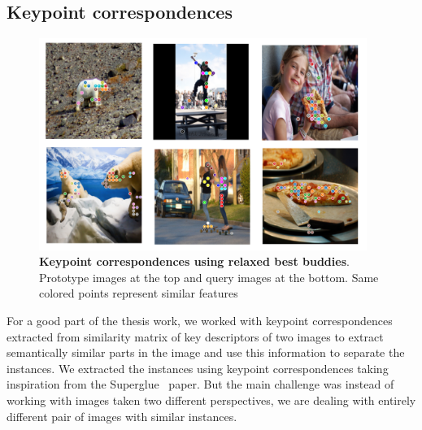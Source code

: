 \subsection{Keypoint correspondences}
\begin{figure}
	\centering
	\includegraphics[width=0.95\textwidth]{Images/main/correspondences.png}
	\caption[\textbf{Keypoint correspondences using relaxed best buddies}]{\textbf{Keypoint correspondences using relaxed best buddies}. Prototype images at the top and query images at the bottom. Same colored points represent similar features }
	\label{fig:correspondecences}
\end{figure}

For a good part of the thesis work, we worked with keypoint correspondences extracted from similarity matrix of key descriptors of two images to extract semantically similar parts in the image and use this information to separate the instances. We extracted the instances using keypoint correspondences taking inspiration from the Superglue~\cite{sarlin2020supergluelearningfeaturematching} paper. But the main challenge was instead of working with images taken two different perspectives, we are dealing with entirely different pair of images with similar instances.


